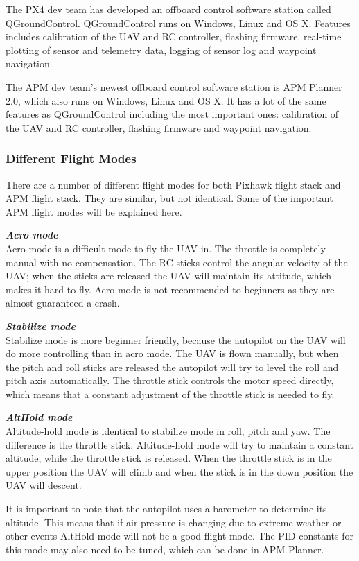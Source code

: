 The PX4 dev team has developed an offboard control software station called QGroundControl. QGroundControl runs on Windows, Linux and OS X. Features includes calibration of the UAV and RC controller, flashing firmware, real-time plotting of sensor and telemetry data, logging of sensor log and waypoint navigation. 

The APM dev team's newest offboard control software station is APM Planner 2.0, which also runs on Windows, Linux and OS X. It has a lot of the same features as QGroundControl including the most important ones: calibration of the UAV and RC controller, flashing firmware and waypoint navigation.

\subsubsection{Different Flight Modes}
There are a number of different flight modes for both Pixhawk flight stack and APM flight stack. They are similar, but not identical. Some of the important APM flight modes will be explained here. 

\emph{\textbf{Acro mode}}\\
Acro mode is a difficult mode to fly the UAV in. The throttle is completely manual with no compensation. The RC sticks control the angular velocity of the UAV; when the sticks are released the UAV will maintain its attitude, which makes it hard to fly. Acro mode is not recommended to beginners as they are almost guaranteed a crash.

\emph{\textbf{Stabilize mode}}\\
Stabilize mode is more beginner friendly, because the autopilot on the UAV will do more controlling than in acro mode. The UAV is flown manually, but when the pitch and roll sticks are released the autopilot will try to level the roll and pitch axis automatically. The throttle stick controls the motor speed directly, which means that a constant adjustment of the throttle stick is needed to fly.

\emph{\textbf{AltHold mode}}\\
Altitude-hold mode is identical to stabilize mode in roll, pitch and yaw. The difference is the throttle stick. Altitude-hold mode will try to maintain a constant altitude, while the throttle stick is released. When the throttle stick is in the upper position the UAV will climb and when the stick is in the down position the UAV will descent. 

It is important to note that the autopilot uses a barometer to determine its altitude. This means that if air pressure is changing due to extreme weather or other events AltHold mode will not be a good flight mode. The PID constants for this mode may also need to be tuned, which can be done in APM Planner.

